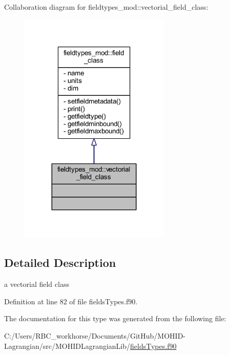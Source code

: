 Collaboration diagram for fieldtypes\+\_\+mod\+:\+:vectorial\+\_\+field\+\_\+class\+:\nopagebreak
\begin{figure}[H]
\begin{center}
\leavevmode
\includegraphics[width=203pt]{structfieldtypes__mod_1_1vectorial__field__class__coll__graph}
\end{center}
\end{figure}


\subsection{Detailed Description}
a vectorial field class 

Definition at line 82 of file fields\+Types.\+f90.



The documentation for this type was generated from the following file\+:\begin{DoxyCompactItemize}
\item 
C\+:/\+Users/\+R\+B\+C\+\_\+workhorse/\+Documents/\+Git\+Hub/\+M\+O\+H\+I\+D-\/\+Lagrangian/src/\+M\+O\+H\+I\+D\+Lagrangian\+Lib/\mbox{\hyperlink{fields_types_8f90}{fields\+Types.\+f90}}\end{DoxyCompactItemize}
